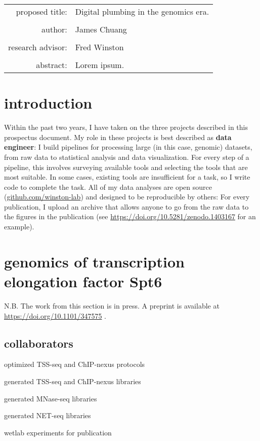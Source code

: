 \documentclass[9pt, letterpaper]{article}
\begin{document}
\begin{titlepage}
\begin{tabular}{ r l }
 proposed title:   & Digital plumbing in the genomics era. \\
 		   & \\
 author:	   & James Chuang \\
 		   & \\
 research advisor: & Fred Winston \\
 		   & \\
 abstract:	   & Lorem ipsum.
\end{tabular}
\end{titlepage}

\tableofcontents
\newpage

\section{introduction}

Within the past two years, I have taken on the three projects described in this prospectus document. My role in these projects is best described as \textbf{data engineer}: I build pipelines for processing large (in this case, genomic) datasets, from raw data to statistical analysis and data visualization. For every step of a pipeline, this involves surveying available tools and selecting the tools that are most suitable. In some cases, existing tools are insufficient for a task, so I write code to complete the task. All of my data analyses are open source (\url{github.com/winston-lab}) and designed to be reproducible by others: For every publication, I upload an archive that allows anyone to go from the raw data to the figures in the publication (see \url{https://doi.org/10.5281/zenodo.1403167} for an example).

\section{genomics of transcription elongation factor Spt6}

N.B. The work from this section is in press. A preprint is available at \url{https://doi.org/10.1101/347575} \cite{doris2018}.

\subsection{collaborators}

\begin{description}[align=right, labelwidth=5cm, noitemsep]
    \item [Steve Doris] optimized TSS-seq and ChIP-nexus protocols
    \item [] generated TSS-seq and ChIP-nexus libraries
    \item [Olga Viktorovskaya] generated MNase-seq libraries
    \item [Magdalenda Murawska] generated NET-seq libraries
    \item [Dan Spatt] wetlab experiments for publication
\end{description}
\end{document}
